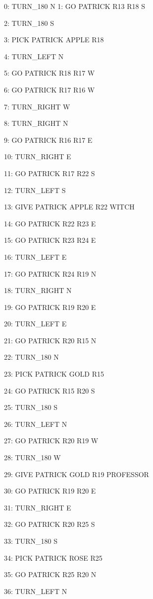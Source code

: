 \documentclass[11pt,a4paper]{article}
\begin{document}
\begin{multicols}{3}
0: TURN\_180 N
        1: GO PATRICK R13 R18 S
        
        2: TURN\_180 S

        
        3: PICK PATRICK APPLE R18

        4: TURN\_LEFT N

        5: GO PATRICK R18 R17 W

        6: GO PATRICK R17 R16 W

        7: TURN\_RIGHT W

        8: TURN\_RIGHT N

        9: GO PATRICK R16 R17 E

       10: TURN\_RIGHT E

       11: GO PATRICK R17 R22 S

       12: TURN\_LEFT S

       13: GIVE PATRICK APPLE R22 WITCH

       14: GO PATRICK R22 R23 E

       15: GO PATRICK R23 R24 E

       16: TURN\_LEFT E

       17: GO PATRICK R24 R19 N

       18: TURN\_RIGHT N

       19: GO PATRICK R19 R20 E

       20: TURN\_LEFT E

       21: GO PATRICK R20 R15 N

       22: TURN\_180 N

       23: PICK PATRICK GOLD R15

       24: GO PATRICK R15 R20 S

       25: TURN\_180 S

       26: TURN\_LEFT N

       27: GO PATRICK R20 R19 W

       28: TURN\_180 W

       29: GIVE PATRICK GOLD R19 PROFESSOR

       30: GO PATRICK R19 R20 E

       31: TURN\_RIGHT E

       32: GO PATRICK R20 R25 S

       33: TURN\_180 S

       34: PICK PATRICK ROSE R25

       35: GO PATRICK R25 R20 N

       36: TURN\_LEFT N


\end{multicols}
\end{document}
